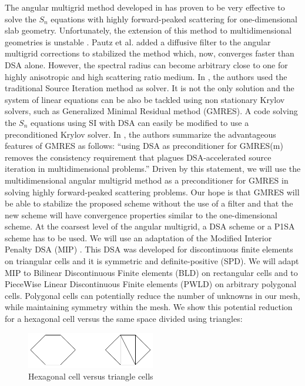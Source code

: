 The angular multigrid method developed in \cite{multigrid_1d} has proven to 
be very effective to solve the $S_n$ equations with highly forward-peaked 
scattering for one-dimensional slab geometry. Unfortunately, the extension 
of this method to multidimensional geometries is unstable \cite{multigrid_2d}. 
Pautz et al. added a diffusive filter to the angular multigrid corrections to
stabilized the method which, now, converges faster than DSA alone. However, 
the spectral radius can become arbitrary close to one for highly anisotropic 
and high scattering ratio medium. In \cite{multigrid_1d,multigrid_2d}, the authors 
used the traditional Source Iteration method as solver. It is not the only
solution and the system of linear equations can be also be tackled using non 
stationary Krylov solvers, such as Generalized Minimal Residual method (GMRES). 
A code solving the $S_n$ equations using SI with DSA can easily be modified to 
use a preconditioned Krylov solver. In \cite{ttg}, the authors summarize the
advantageous features of GMRES as follows: ``using DSA as preconditioner for
GMRES(m) removes the consistency requirement that plagues DSA-accelerated
source iteration in multidimensional problems.'' Driven by this statement, we
will use the multidimensional angular multigrid method as a preconditioner for
GMRES in solving highly forward-peaked scattering problems. Our hope is
that GMRES will be able to stabilize the proposed scheme without the use of a
filter and that the new scheme will have convergence properties similar to the
one-dimensional scheme. At the coarsest level of the angular multigrid, a DSA 
scheme or a P1SA scheme has to be used. We will use an adaptation of the Modified 
Interior Penalty DSA (MIP) \cite{mip}. This DSA was developed for discontinuous 
finite elements on triangular cells and it is symmetric and definite-positive 
(SPD). We will adapt MIP to Bilinear Discontinuous Finite elements (BLD) on 
rectangular cells and to PieceWise Linear Discontinuous Finite elements (PWLD) 
\cite{pwld_3d,pwld_2d} on arbitrary polygonal cells. Polygonal cells can 
potentially reduce the number of unknowns in our mesh, while maintaining symmetry 
within the mesh. We show this potential reduction for a hexagonal cell versus 
the same space divided using triangles:
\begin{figure}[H]
\centering
\includegraphics[width=0.5\textwidth]{./Introduction/hex_tri_cells}
\caption{Hexagonal cell versus triangle cells}
\end{figure}
